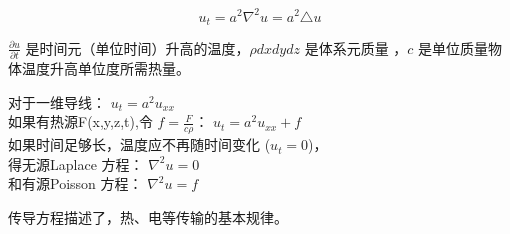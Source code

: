 \begin{equation*}
u_t=a^2 \nabla ^2 u = a^2 \triangle u	
\end{equation*}
\begin{note}
$\frac{\partial u }{\partial t}$ 是时间元（单位时间）升高的温度，$ \rho  dxdydz $ 是体系元质量 ，$c$ 是单位质量物体温度升高单位度所需热量。
\end{note}
对于一维导线：
{ $\displaystyle u_t= a^2 u_{xx}$ }  \\ 
如果有热源F(x,y,z,t),令 $f=\frac{F}{c\rho}$：	{$\displaystyle u_t= a^2 u_{xx}+f$ }  \\
如果时间足够长，温度应不再随时间变化 ($u_t =0$)， \\ 
得无源Laplace 方程： { $\displaystyle   \nabla ^2 u =0$ }  \\ 
和有源Poisson 方程： { $\displaystyle   \nabla ^2 u =f$ }  \\ 

\begin{remark}
	传导方程描述了，热、电等传输的基本规律。
\end{remark}

